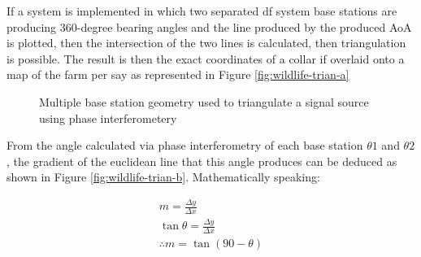 \documentclass[class=report,11pt,crop=false]{standalone}
\begin{document}
If a system is implemented in which two separated \gls{df} system base stations are producing 360-degree bearing angles and the line produced by the produced \gls{AoA} is plotted, then the intersection of the two lines is calculated, then triangulation is possible. The result is then the exact coordinates of a collar if overlaid onto a map of the farm per say as represented in Figure \ref{fig:wildlife-trian-a}

\begin{figure}[h]\centering
    \hspace{0.5cm}
    \hfill 
    \caption{Multiple base station geometry used to triangulate a signal source using phase interferometery}
    \label{fig:wildlife-trian}
\end{figure}


From the angle calculated via phase interferometry of each base station $\theta1$ and $\theta2$, the gradient of the euclidean line that this angle produces can be deduced as shown in Figure \ref{fig:wildlife-trian-b}. Mathematically speaking:

\begin{equation*}
\begin{split}
    m = \frac{\Delta y}{\Delta x} \\
    \tan \theta = \frac{\Delta y}{\Delta x} \\
    \therefore m = \tan(90 - \theta) 
\end{split}
\end{equation*}
\end{document}
